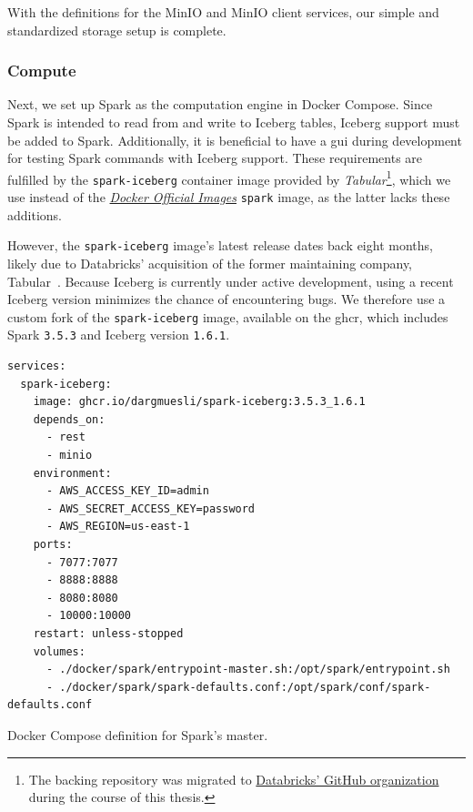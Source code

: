 With the definitions for the MinIO and MinIO client services, our simple and standardized storage setup is complete.

\subsubsection{Compute}
\label{sec:implementation-infrastructure-compute}

Next, we set up Spark as the computation engine in Docker Compose.
Since Spark is intended to read from and write to Iceberg tables, Iceberg support must be added to Spark.
Additionally, it is beneficial to have a \ac{gui} during development for testing Spark commands with Iceberg support.
These requirements are fulfilled by the \texttt{spark-iceberg} container image provided by \textit{Tabular}\footnote{The backing repository was migrated to \href{https://github.com/databricks/}{Databricks' GitHub organization} during the course of this thesis.}, which we use instead of the \href{https://docs.docker.com/trusted-content/official-images/}{\textit{Docker Official Images}} \texttt{spark} image, as the latter lacks these additions.

However, the \texttt{spark-iceberg} image's latest release dates back eight months, likely due to Databricks' acquisition of the former maintaining company, Tabular~\cite{Databricks2024}.
Because Iceberg is currently under active development, using a recent Iceberg version minimizes the chance of encountering bugs.
We therefore use a custom fork of the \texttt{spark-iceberg} image, available on the \ac{ghcr}, which includes Spark \texttt{3.5.3} and Iceberg version \texttt{1.6.1}.

\begin{listing}[H]
\begin{verbatim}
services:
  spark-iceberg:
    image: ghcr.io/dargmuesli/spark-iceberg:3.5.3_1.6.1
    depends_on:
      - rest
      - minio
    environment:
      - AWS_ACCESS_KEY_ID=admin
      - AWS_SECRET_ACCESS_KEY=password
      - AWS_REGION=us-east-1
    ports:
      - 7077:7077
      - 8888:8888
      - 8080:8080
      - 10000:10000
    restart: unless-stopped
    volumes:
      - ./docker/spark/entrypoint-master.sh:/opt/spark/entrypoint.sh
      - ./docker/spark/spark-defaults.conf:/opt/spark/conf/spark-defaults.conf
\end{verbatim}
\caption{Docker Compose definition for Spark's master.}
\label{lst:compose-spark-master}
\end{listing}

